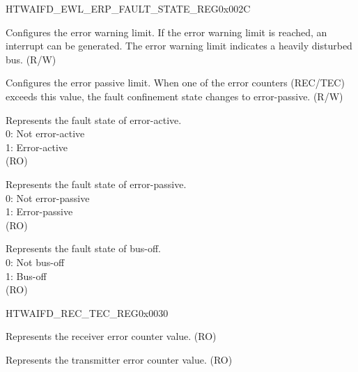 \begin{register}{H}{TWAIFD\_EWL\_ERP\_FAULT\_STATE\_REG}{0x002C}\label{regdesc:TWAIFDEWLERPFAULTSTATEREG}
%
%
%
%
%
%
\regnewline%
\begin{regdesc}\begin{reglist}
\label{fielddesc:TWAIFDEWLIMIT}\item [TWAIFD\_EW\_LIMIT] Configures the error warning limit. If the error warning limit is reached, an interrupt can be generated. The error warning limit indicates a heavily disturbed bus. (R/W)
\label{fielddesc:TWAIFDERPLIMIT}\item [TWAIFD\_ERP\_LIMIT] Configures the error passive limit. When one of the error counters (REC/TEC) exceeds this value, the fault confinement state changes to error-passive. (R/W)
\label{fielddesc:TWAIFDERA}\item [TWAIFD\_ERA] Represents the fault state of error-active.\\
0: Not error-active\\
1: Error-active\\
(RO)
\label{fielddesc:TWAIFDERP}\item [TWAIFD\_ERP] Represents the fault state of error-passive.\\
0: Not error-passive\\
1: Error-passive\\
(RO)
\label{fielddesc:TWAIFDBOF}\item [TWAIFD\_BOF] Represents the fault state of bus-off.\\
0: Not bus-off\\
1: Bus-off\\
(RO)
\end{reglist}\end{regdesc}
\end{register}


\begin{register}{H}{TWAIFD\_REC\_TEC\_REG}{0x0030}\label{regdesc:TWAIFDRECTECREG}
%
%
%
%
\regnewline%
\begin{regdesc}\begin{reglist}
\label{fielddesc:TWAIFDRECVAL}\item [TWAIFD\_REC\_VAL] Represents the receiver error counter value. (RO)
\label{fielddesc:TWAIFDTECVAL}\item [TWAIFD\_TEC\_VAL] Represents the transmitter error counter value. (RO)
\end{reglist}\end{regdesc}
\end{register}


